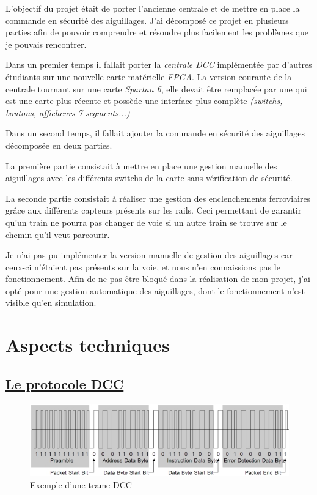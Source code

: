 L'objectif du projet était de porter l'ancienne centrale et de mettre en place la commande en sécurité des aiguillages.
J'ai décomposé ce projet en plusieurs parties afin de pouvoir comprendre et résoudre plus facilement les problèmes que je pouvais rencontrer.

\smallskip

Dans un premier temps il fallait porter la
\emph{centrale DCC} implément\'ee par d'autres \'etudiants sur une nouvelle
carte mat\'erielle \emph{FPGA}. La version courante de la centrale tournant sur
une carte \emph{Spartan 6}, elle devait être remplac\'ee par une \crt qui est
une carte plus r\'ecente et possède une interface plus complète
\emph{(switchs, boutons, afficheurs 7 segments...)}

\smallskip

Dans un second temps, il fallait ajouter la commande en
sécurité des aiguillages décomposée en deux parties.

\smallskip

La première partie consistait à mettre en place une gestion manuelle
des aiguillages avec les diff\'erents switchs de la carte sans v\'erification de
s\'ecurit\'e.

La seconde partie consistait à réaliser une gestion des
enclenchements ferroviaires grâce aux différents capteurs pr\'esents sur
les rails. Ceci permettant de garantir qu'un train ne pourra pas
changer de voie si un autre train se trouve sur le chemin
qu'il veut parcourir. 

\smallskip

Je n'ai pas pu implémenter la version manuelle de gestion des aiguillages  car ceux-ci
 n'étaient pas présents sur la voie, et nous n'en connaissions pas
le fonctionnement. Afin de ne pas être bloqué dans la réalisation de mon projet,
j'ai opté pour une gestion automatique des
aiguillages, dont le fonctionnement n'est visible qu'en simulation.


\newpage
\section{Aspects techniques}
\label{sec:asp_tech}

\subsection{\underline{Le protocole DCC}}
\label{sec:dcc}


\begin{figure}[h]
\centering
\includegraphics[scale=0.75]{trame.png}
\caption{Exemple d'une trame DCC}
\label{fig1}
\end{figure}

